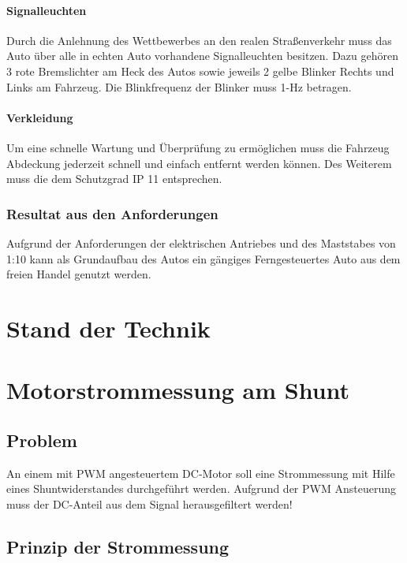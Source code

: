 \documentclass[11pt,twoside,a4paper,openright]{mpreport}
\begin{document}
\subsubsection{Signalleuchten}
Durch die Anlehnung des Wettbewerbes an den realen Straßenverkehr muss das Auto über alle in echten Auto vorhandene Signalleuchten besitzen. 
Dazu gehören 3 rote Bremslichter am Heck des Autos sowie jeweils 2 gelbe Blinker Rechts und Links am Fahrzeug.  Die Blinkfrequenz der Blinker muss
1-Hz betragen.

\subsubsection{Verkleidung}
Um eine schnelle Wartung und Überprüfung zu ermöglichen muss die Fahrzeug Abdeckung jederzeit schnell und einfach entfernt werden können. Des Weiterem muss die dem 
Schutzgrad IP 11 entsprechen.


\subsection{Resultat aus den Anforderungen}
Aufgrund der Anforderungen der elektrischen Antriebes und des Maststabes von 1:10 kann als Grundaufbau des Autos ein gängiges Ferngesteuertes Auto aus dem
freien Handel genutzt werden.






\chapter{Stand der Technik}

\chapter{Motorstrommessung am Shunt}


\section{Problem}

An einem mit PWM angesteuertem DC-Motor soll eine Strommessung mit Hilfe eines Shuntwiderstandes
durchgeführt werden. Aufgrund der PWM Ansteuerung muss der DC-Anteil aus dem Signal herausgefiltert werden!


\section{Prinzip der Strommessung}
\end{document}
